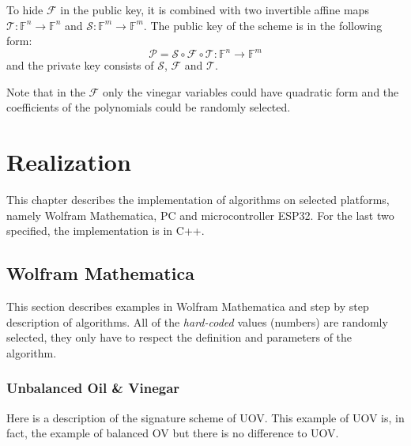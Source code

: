 \documentclass[thesis=M,english]{FITthesis}[2019/12/23]
\begin{document}
\bigskip
\noindent
To hide $\mathcal{F}$ in the public key, it is combined with two invertible affine maps $\mathcal{T}: \mathbb{F}^n \rightarrow \mathbb{F}^n$ and $\mathcal{S}: \mathbb{F}^m \rightarrow \mathbb{F}^m$. The public key of the scheme is in the following form:
\[
\mathcal{P} = \mathcal{S} \circ \mathcal{F} \circ \mathcal{T} : \mathbb{F}^n \rightarrow \mathbb{F}^m
\]
and the private key consists of $\mathcal{S}$, $\mathcal{F}$ and $\mathcal{T}$.

\bigskip
\noindent
Note that in the $\mathcal{F}$ only the vinegar variables could have quadratic form and the coefficients of the polynomials could be randomly selected.

\chapter{Realization}
This chapter describes the implementation of algorithms on selected platforms, namely Wolfram Mathematica, PC and microcontroller ESP32. For the last two specified, the implementation is in C++.

\section{Wolfram Mathematica}
This section describes examples in Wolfram Mathematica and step by step description of algorithms. All of the \textit{hard-coded} values (numbers) are randomly selected, they only have to respect the definition and parameters of the algorithm.

\subsection{Unbalanced Oil \& Vinegar}
Here is a description of the signature scheme of UOV. This example of UOV is, in fact, the example of balanced OV but there is no difference to UOV.
\end{document}
